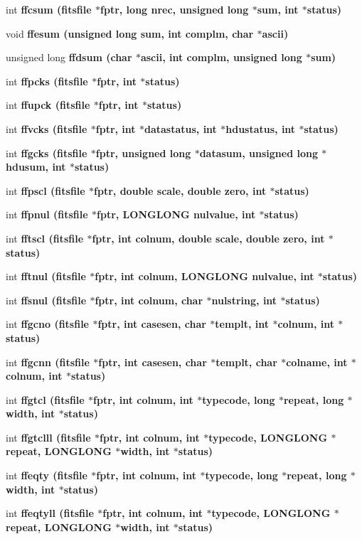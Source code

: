 \begin{CompactItemize}
int \bf{ffcsum} (\bf{fitsfile} $\ast$fptr, long nrec, unsigned long $\ast$sum, int $\ast$status)
\item 
void \bf{ffesum} (unsigned long sum, int complm, char $\ast$ascii)
\item 
unsigned long \bf{ffdsum} (char $\ast$ascii, int complm, unsigned long $\ast$sum)
\item 
int \bf{ffpcks} (\bf{fitsfile} $\ast$fptr, int $\ast$status)
\item 
int \bf{ffupck} (\bf{fitsfile} $\ast$fptr, int $\ast$status)
\item 
int \bf{ffvcks} (\bf{fitsfile} $\ast$fptr, int $\ast$datastatus, int $\ast$hdustatus, int $\ast$status)
\item 
int \bf{ffgcks} (\bf{fitsfile} $\ast$fptr, unsigned long $\ast$datasum, unsigned long $\ast$hdusum, int $\ast$status)
\item 
int \bf{ffpscl} (\bf{fitsfile} $\ast$fptr, double scale, double zero, int $\ast$status)
\item 
int \bf{ffpnul} (\bf{fitsfile} $\ast$fptr, \bf{LONGLONG} nulvalue, int $\ast$status)
\item 
int \bf{fftscl} (\bf{fitsfile} $\ast$fptr, int colnum, double scale, double zero, int $\ast$status)
\item 
int \bf{fftnul} (\bf{fitsfile} $\ast$fptr, int colnum, \bf{LONGLONG} nulvalue, int $\ast$status)
\item 
int \bf{ffsnul} (\bf{fitsfile} $\ast$fptr, int colnum, char $\ast$nulstring, int $\ast$status)
\item 
int \bf{ffgcno} (\bf{fitsfile} $\ast$fptr, int casesen, char $\ast$templt, int $\ast$colnum, int $\ast$status)
\item 
int \bf{ffgcnn} (\bf{fitsfile} $\ast$fptr, int casesen, char $\ast$templt, char $\ast$colname, int $\ast$colnum, int $\ast$status)
\item 
int \bf{ffgtcl} (\bf{fitsfile} $\ast$fptr, int colnum, int $\ast$typecode, long $\ast$repeat, long $\ast$width, int $\ast$status)
\item 
int \bf{ffgtclll} (\bf{fitsfile} $\ast$fptr, int colnum, int $\ast$typecode, \bf{LONGLONG} $\ast$repeat, \bf{LONGLONG} $\ast$width, int $\ast$status)
\item 
int \bf{ffeqty} (\bf{fitsfile} $\ast$fptr, int colnum, int $\ast$typecode, long $\ast$repeat, long $\ast$width, int $\ast$status)
\item 
int \bf{ffeqtyll} (\bf{fitsfile} $\ast$fptr, int colnum, int $\ast$typecode, \bf{LONGLONG} $\ast$repeat, \bf{LONGLONG} $\ast$width, int $\ast$status)

\end{CompactItemize}
